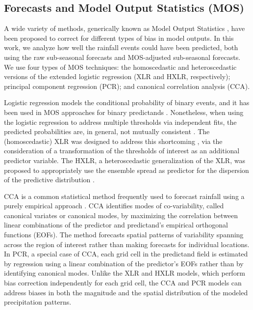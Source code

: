\documentclass[twocol]{ametsoc}
\begin{document}
\subsection{Forecasts and Model Output Statistics (MOS)}

A wide variety of methods, generically known as Model Output Statistics \citep[MOS;][]{Glahn:1972vt}, have been proposed to correct for different types of bias in model outputs.
In this work, we analyze how well the rainfall events could have been predicted, both using the raw sub-seasonal forecasts and  MOS-adjusted sub-seasonal forecasts.
We use  four types of MOS techniques: the homoscedastic and heteroscedastic versions of the extended logistic regression (XLR and HXLR, respectively); principal component regression (PCR); and canonical correlation analysis (CCA).

Logistic regression models the conditional probability of binary events, and it has been used in MOS approaches for binary predictands \citep{Hamill:2004hk}.
Nonetheless, when using the logistic regression to address multiple thresholds via independent fits, the predicted probabilities are, in general, not mutually consistent \citep{Messner:2014gp}.
The (homoscedastic) XLR was designed to address this shortcoming \citep{Wilks:2009bk}, via the consideration of a transformation of the thresholds of interest as an additional predictor variable.
The HXLR, a heteroscedastic generalization of the XLR, was proposed to appropriately use the ensemble spread as predictor for the dispersion of the predictive distribution \citep{Messner:2014gp}.

CCA is a common statistical method frequently used to forecast rainfall using a purely empirical approach \citep{Mason:2008da,Barnston:2012ce,Jolliffe2012:vm,Barnston:1992gd,Wilks:2006fx}.
CCA identifies modes of co-variability, called canonical variates or canonical modes, by maximizing the correlation between linear combinations of the predictor and predictand's empirical orthogonal functions (EOFs).
The method forecasts spatial patterns of variability spanning across the region of interest rather than making forecasts for individual locations.
In PCR, a special case of CCA, each grid cell in the predictand field is estimated by regression using a linear combination of the predictor's EOFs \citep{Mason:2008da,Wilks:2006fx} rather than by identifying canonical modes.
Unlike the XLR and HXLR models, which perform bias correction independently for each grid cell, the CCA and PCR models can address biases in both the magnitude and the spatial distribution of the modeled precipitation patterns.
\end{document}
